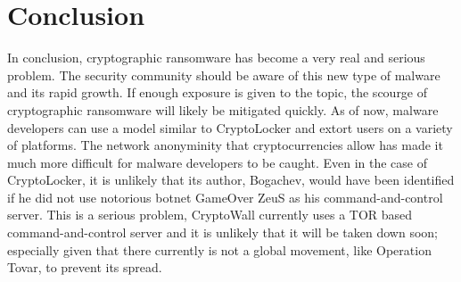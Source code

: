 \documentclass[11.5pt]{article}
\begin{document}
\section{Conclusion}
	In conclusion, cryptographic ransomware has become a very real and serious problem. The security community should be aware of this new type of malware and its rapid growth.  If enough exposure is given to the topic, the scourge of cryptographic ransomware will likely be mitigated quickly.  As of now, malware developers can use a model similar to CryptoLocker and extort users on a variety of platforms.  The network anonyminity that cryptocurrencies allow has made it much more difficult for malware developers to be caught.  Even in the case of CryptoLocker, it is unlikely that its author, Bogachev, would have been identified if he did not use notorious botnet GameOver ZeuS as his command-and-control server.  This is a serious problem, CryptoWall currently uses a TOR based command-and-control server and it is unlikely that it will be taken down soon; especially given that there currently is not a global movement, like Operation Tovar, to prevent its spread.    


\newpage


\end{document}

